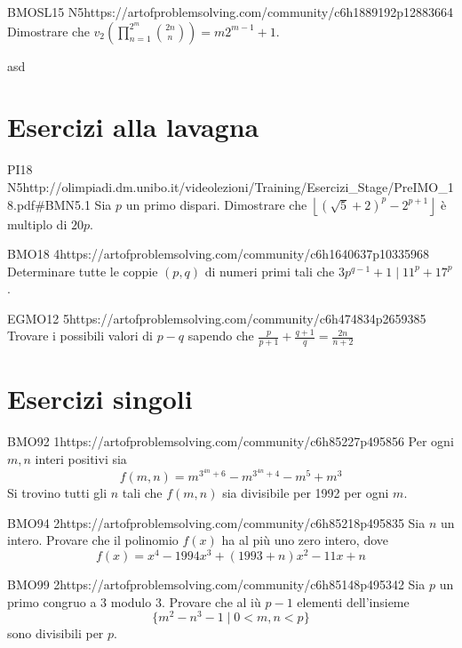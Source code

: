 \documentclass[12pt]{article}
\begin{document}
\begin{esercizio}{BMOSL15 N5}{https://artofproblemsolving.com/community/c6h1889192p12883664}
    Dimostrare che $v_2\left(\prod_{n=1}^{2^m}\binom{2n}{n}\right)=m2^{m-1}+1$.
\end{esercizio}

\begin{exercise}
asd
\end{exercise}


\section{Esercizi alla lavagna}

\begin{esercizio}{PI18 N5}{http://olimpiadi.dm.unibo.it/videolezioni/Training/Esercizi_Stage/PreIMO_18.pdf\#BMN5.1}
    Sia $p$ un primo dispari. Dimostrare che $\left\lfloor (\sqrt5+2)^p-2^{p+1} \right\rfloor$ è multiplo di $20p$.
\end{esercizio}

\begin{esercizio}{BMO18 4}{https://artofproblemsolving.com/community/c6h1640637p10335968}
    Determinare tutte le coppie $(p,q)$ di numeri primi tali che $3p^{q-1}+1\mid11^p+17^p$.
\end{esercizio}

\begin{esercizio}{EGMO12 5}{https://artofproblemsolving.com/community/c6h474834p2659385}
    Trovare i possibili valori di $p-q$ sapendo che $\frac{p}{p+1}+\frac{q+1}{q}=\frac{2n}{n+2}$
\end{esercizio}

\section{Esercizi singoli}

\begin{esercizio}{BMO92 1}{https://artofproblemsolving.com/community/c6h85227p495856}
Per ogni $m,n$ interi positivi sia
\[f(m,n)=m^{3^{4n}+6}-m^{3^{4n}+4}-m^{5}+m^{3}\]
Si trovino tutti gli $n$ tali che $f(m,n)$ sia divisibile per 1992 per ogni $m$.
\end{esercizio}

\begin{esercizio}{BMO94 2}{https://artofproblemsolving.com/community/c6h85218p495835}
Sia $n$ un intero. Provare che il polinomio $f(x)$ ha al più uno zero intero, dove
\[f(x)=x^{4}-1994x^{3}+(1993+n)x^{2}-11x+n\]
\end{esercizio}

\begin{esercizio}{BMO99 2}{https://artofproblemsolving.com/community/c6h85148p495342}
Sia $p$ un primo congruo a 3 modulo 3. Provare che al iù $p-1$ elementi dell'insieme 
\[\{m^{2}-n^{3}-1\mid 0<m,n<p\}\]
sono divisibili per $p$.
\end{esercizio}
\end{document}
